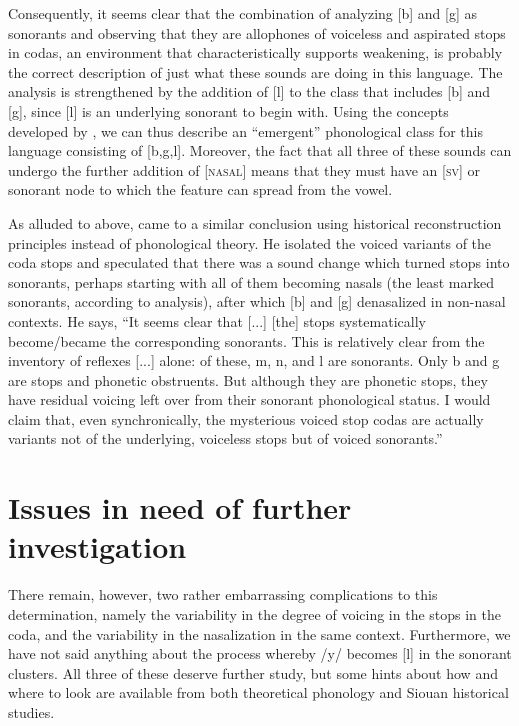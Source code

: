 \documentclass[output=paper]{LSP/langsci}
\begin{document}
Consequently, it seems clear that the combination of analyzing [b] and [g] as sonorants and observing that they are allophones of voiceless and aspirated stops in codas, an environment that characteristically supports weakening, is probably the correct description of just what these sounds are doing in this language. The analysis is strengthened by the addition of [l] to the class that includes [b] and [g], since [l] is an underlying sonorant to begin with. Using the concepts developed by \citet{Mielke2008}, we can thus describe an ``emergent'' phonological class for this language consisting of [b,g,l]. Moreover, the fact that all three of these sounds can undergo the further addition of [\textsc{nasal}] means that they must have an [\textsc{sv}] or sonorant node to which the feature can spread from the vowel.

As alluded to above, \citet[5]{Rankin2001} came to a similar conclusion using historical reconstruction principles instead of phonological theory. He isolated the voiced variants of the coda stops and speculated that there was a sound change which turned stops into sonorants, perhaps starting with all of them becoming nasals (the least marked sonorants, according to  analysis), after which [b] and [g] denasalized in non-nasal contexts. He says, ``It seems clear that [...] [the] stops systematically become/became the corresponding sonorants. This is relatively clear from the inventory of reflexes [...] alone: of these, m, n,  and l are sonorants. Only b and g are stops and phonetic obstruents. But although they are phonetic stops, they have residual voicing left over from their sonorant phonological status. I would claim that, even synchronically, the mysterious voiced stop codas are actually variants not of the underlying, voiceless stops but of voiced sonorants.''

\section{Issues in need of further investigation}

There remain, however, two rather embarrassing complications to this determination, namely the variability in the degree of voicing in the stops in the coda, and the variability in the nasalization in the same context. Furthermore, we have not said anything about the process whereby /y/ becomes [l] in the sonorant clusters. All three of these deserve further study, but some hints about how and where to look are available from both theoretical phonology and Siouan historical studies.
\end{document}
